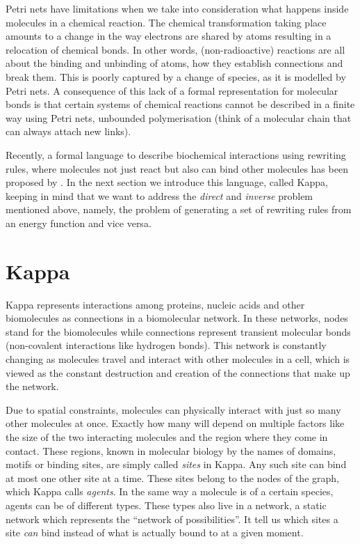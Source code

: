 Petri nets have limitations when we take into consideration
what happens inside molecules in a chemical reaction.
The chemical transformation taking place amounts to
a change in the way electrons are shared by atoms
resulting in a relocation of chemical bonds.
In other words, (non-radioactive) reactions are all about
the binding and unbinding of atoms,
how they establish connections and break them.
This is poorly captured by a change of species,
as it is modelled by Petri nets.
A consequence of this lack of a formal representation for
molecular bonds is that certain systems of chemical reactions
cannot be described in a finite way using Petri nets,
\eg unbounded polymerisation
(think of a molecular chain that can always attach new links).

Recently,
a formal language to describe biochemical interactions
using rewriting rules,
where molecules not just react but also can bind other molecules
has been proposed by \citet{danoslaneve2002a}.
In the next section we introduce this language, called Kappa,
keeping in mind that we want to address
the \emph{direct} and \emph{inverse} problem mentioned above,
namely, the problem of generating a set of rewriting rules
from an energy function and vice versa.


\section{Kappa}
\label{sec:kappa}

Kappa represents interactions among proteins,
nucleic acids and other biomolecules as
connections in a biomolecular network.
In these networks, nodes stand for the biomolecules
while connections represent transient molecular bonds
(\eg non-covalent interactions like hydrogen bonds).
This network is constantly changing as molecules
travel and interact with other molecules in a cell,
which is viewed as the constant destruction and creation
of the connections that make up the network.

Due to spatial constraints,
molecules can physically interact with
just so many other molecules at once.
Exactly how many will depend on multiple factors like
the size of the two interacting molecules and
the region where they come in contact.
These regions, known in molecular biology by the names of domains,
motifs or binding sites, are simply called \emph{sites} in Kappa.
Any such site can bind at most one other site at a time.
These sites belong to the nodes of the graph,
which Kappa calls \emph{agents}.
In the same way a molecule is of a certain species,
agents can be of different types.
These types also live in a network,
a static network which represents the ``network of possibilities''.
It tell us which sites a site \emph{can} bind
instead of what is actually bound to at a given moment.

